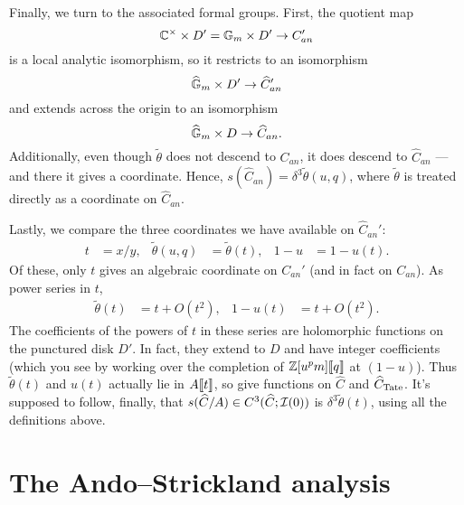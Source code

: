 Finally, we turn to the associated formal groups.  First, the quotient map \[\mathbb{C}^\times \times D' = \mathbb G_m \times D' \to C_{an}'\] is a local analytic isomorphism, so it restricts to an isomorphism \[\widehat{\mathbb G}_m \times D' \to \widehat C_{an}'\] and extends across the origin to an isomorphism \[\widehat{\mathbb G}_m \times D \to \widehat C_{an}.\]  Additionally, even though $\tilde\theta$ does not descend to $C_{an}$, it does descend to $\widehat C_{an}$ --- and there it gives a coordinate.  Hence, $s(\widehat C_{an}) = \delta^3 \tilde\theta(u, q)$, where $\tilde\theta$ is treated directly as a coordinate on $\widehat C_{an}$.

Lastly, we compare the three coordinates we have available on $\widehat C_{an}'$:
\begin{align*}
t & = x/y, &
\tilde\theta(u, q) & = \tilde\theta(t), &
1 - u & = 1 - u(t).
\end{align*}
Of these, only $t$ gives an algebraic coordinate on $C_{an}'$ (and in fact on $C_{an}$).  As power series in $t$,
\begin{align*}
\tilde\theta(t) & = t + O(t^2), &
1 - u(t) & = t + O(t^2).
\end{align*}
The coefficients of the powers of $t$ in these series are holomorphic functions on the punctured disk $D'$.  In fact, they extend to $D$ and have integer coefficients (which you see by working over the completion of $\mathbb Z[u^pm]\llbracket{q}\rrbracket$ at $(1 - u)$).  Thus $\tilde\theta(t)$ and $u(t)$ actually lie in $A\llbracket{t}\rrbracket$, so give functions on $\widehat C$ and $\widehat C_{\mathrm{Tate}}$.  It's supposed to follow, finally, that $s(\widehat C/A) \in C^3(\widehat C; \mathcal{I}(0))$ is $\delta^3 \tilde\theta(t)$, using all the definitions above.








\section{The Ando--Strickland analysis}


